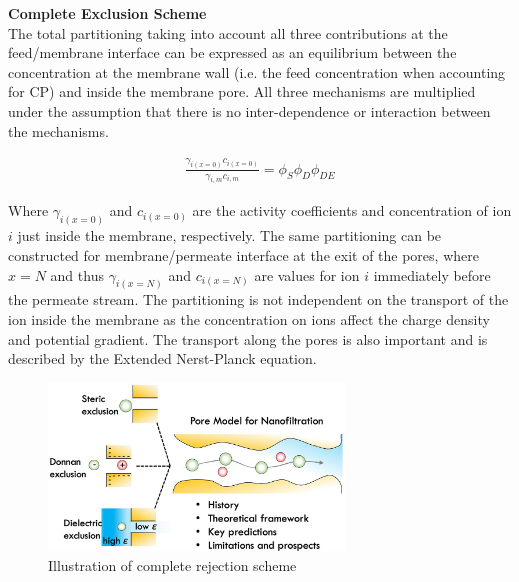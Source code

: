 \textbf{Complete Exclusion Scheme}\\
The total partitioning taking into account all three contributions at the feed/membrane interface can be expressed as an equilibrium between the concentration at the membrane wall (i.e. the feed concentration when accounting for CP) and inside the membrane pore. \citep{wangPoreModelNanofiltration2021}
All three mechanisms are multiplied under the assumption that there is no inter-dependence or interaction between the mechanisms.
\begin{ceqn}
\begin{align}
    \frac{\gamma_{i(x=0)}c_{i(x=0)}}{\gamma_{i,m}c_{i,m}}=\phi_S\phi_{D}\phi_{DE}
\end{align}
\end{ceqn}

Where $\gamma_{i(x=0)}$ and $c_{i(x=0)}$ are the activity coefficients and concentration of ion $i$ just inside the membrane, respectively.
The same partitioning can be constructed for membrane/permeate interface at the exit of the pores, where $x=N$ and thus $\gamma_{i(x=N)}$ and $c_{i(x=N)}$ are values for ion $i$ immediately before the permeate stream.
The partitioning is not independent on the transport of the ion inside the membrane as the concentration on ions affect the charge density and potential gradient.
The transport along the pores is also important and is described by the Extended Nerst-Planck equation. \citep{wangPoreModelNanofiltration2021}


\begin{figure}
    \centering
    \includegraphics[width=0.7\textwidth]{Billeder/teori/samlet_exclusion.jpg}
    \caption{Illustration of complete rejection scheme}
    \label{fig:complete_exclusion_scheme}
\end{figure}




